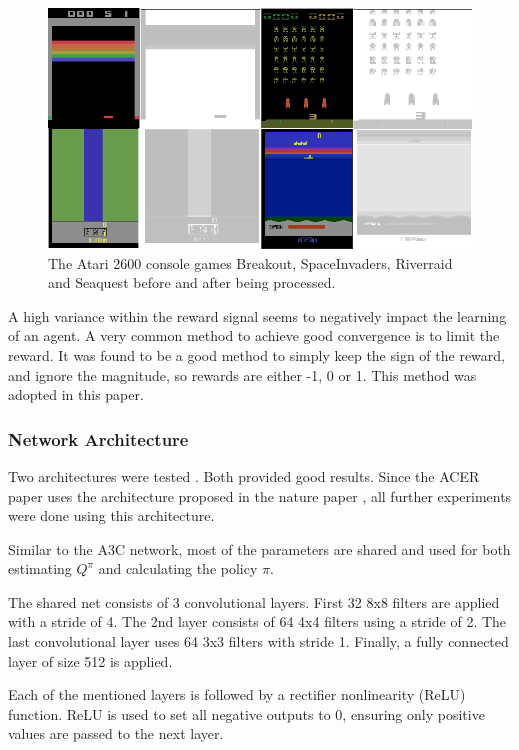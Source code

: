 \begin{figure}
\includegraphics[scale=0.5]{bilder/atarienv.png}
\caption{The Atari 2600 console games Breakout, SpaceInvaders, Riverraid and Seaquest before and after being processed.}
\end{figure}

A high variance within the reward signal seems to negatively impact the learning of an agent.
A very common method to achieve good convergence is to limit the reward. 
It was found to be a good method to simply keep the sign of the reward, and ignore the magnitude, so rewards are either -1, 0 or 1. This method was adopted in this paper.


\subsubsection{Network Architecture}

Two architectures were tested \citep{mnih2015atari,nature}.
Both provided good results. Since the ACER paper uses the architecture proposed in the nature paper \citep{nature}, all further experiments were done using this architecture.

Similar to the A3C \citep{A3C} network, most of the parameters are shared and used for both estimating $Q^\pi$ and calculating the policy $\pi$.

The shared net consists of 3 convolutional layers.
First 32 8x8 filters are applied with a stride of 4.
The 2nd layer consists of 64 4x4 filters using a stride of 2.
The last convolutional layer uses 64 3x3 filters with stride 1.
Finally, a fully connected layer of size 512 is applied.

Each of the mentioned layers is followed by a rectifier nonlinearity (ReLU) function.
ReLU is used to set all negative outputs to 0, ensuring only positive values are passed to the next layer.


